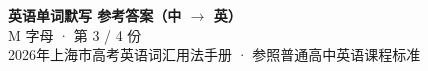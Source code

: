 \documentclass[10pt,a4paper]{article}
\begin{document}
\pagestyle{plain}

\begin{center}
{\LARGE\bfseries 英语单词默写 \quad 参考答案（中 $\to$ 英）}\\[0.22em]
{\large M 字母 · 第 3 / 4 份}\\[0.18em]
{\small 2026年上海市高考英语词汇用法手册 · 参照普通高中英语课程标准}
\end{center}

\vspace{0.2em}
\noindent{\color{rulegray}\rule{\textwidth}{0.8pt}}

\vspace{0.35em}

\vspace{0.25em}
\renewcommand{\arraystretch}{1.32}
\end{document}
